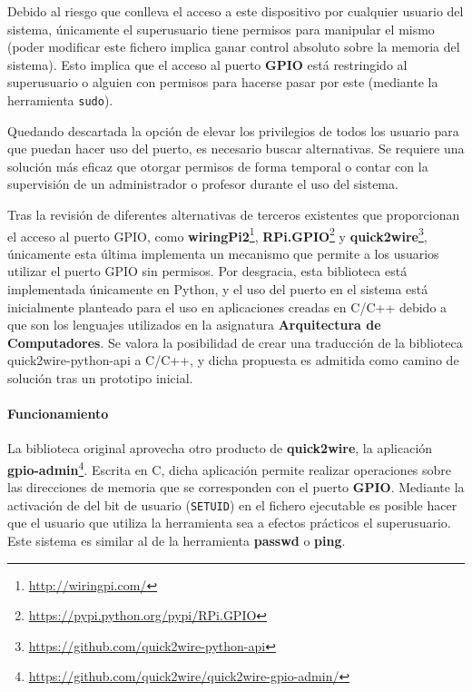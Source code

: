 Debido al riesgo que conlleva el acceso a este dispositivo por cualquier usuario del sistema, únicamente el superusuario tiene permisos para manipular el mismo (poder modificar este fichero implica ganar control absoluto sobre la memoria del sistema). Esto implica que el acceso al puerto \textbf{GPIO} está restringido al superusuario o alguien con permisos para hacerse pasar por este (mediante la herramienta \texttt{sudo}).

Quedando descartada la opción de elevar los privilegios de todos los usuario para que puedan hacer uso del puerto, es necesario buscar alternativas. Se requiere una solución más eficaz que otorgar permisos de forma temporal o contar con la supervisión de un administrador o profesor durante el uso del sistema.

Tras la revisión de diferentes alternativas de terceros existentes que proporcionan el acceso al puerto GPIO, como \textbf{wiringPi2}\footnote{\href{http://wiringpi.com/}{http://wiringpi.com/}}, \textbf{RPi.GPIO}\footnote{\href{https://pypi.python.org/pypi/RPi.GPIO}{https://pypi.python.org/pypi/RPi.GPIO}} y \textbf{quick2wire}\footnote{\href{https://github.com/quick2wire-python-api}{https://github.com/quick2wire-python-api}}, únicamente esta última implementa un mecanismo que permite a los usuarios utilizar el puerto GPIO sin permisos. Por desgracia, esta biblioteca está implementada únicamente en Python, y el uso del puerto en el sistema está inicialmente planteado para el uso en aplicaciones creadas en C/C++ debido a que son los lenguajes utilizados en la asignatura \textbf{Arquitectura de Computadores}. Se valora la posibilidad de crear una traducción de la biblioteca quick2wire-python-api a C/C++, y dicha propuesta es admitida como camino de solución tras un prototipo inicial.

\paragraph{Funcionamiento\\}

La biblioteca original aprovecha otro producto de \textbf{quick2wire}, la aplicación \textbf{gpio-admin}\footnote{\href{https://github.com/quick2wire/quick2wire-gpio-admin/}{https://github.com/quick2wire/quick2wire-gpio-admin/}}. Escrita en C, dicha aplicación permite realizar operaciones sobre las direcciones de memoria que se corresponden con el puerto \textbf{GPIO}. Mediante la activación de del bit de usuario (\texttt{SETUID}) en el fichero ejecutable es posible hacer que el usuario que utiliza la herramienta sea a efectos prácticos el superusuario. Este sistema es similar al de la herramienta \textbf{passwd} o \textbf{ping}.

